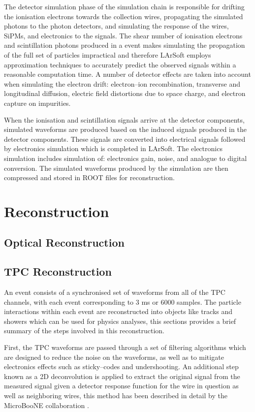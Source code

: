 The detector simulation phase of the simulation chain is responsible for
drifting the ionisation electrons towards the collection wires, propagating the
simulated photons to the photon detectors, and simulating the response of the
wires, SiPMs, and electronics to the signals. The shear number of ionisation 
electrons and scintillation photons produced in a \protodune{} event makes 
simulating the propagation of the full set of particles impractical and 
therefore LArSoft employs approximation techniques to accurately predict the 
observed signals within a reasonable computation time. A number of detector 
effects are taken into account when simulating the electron drift: 
electron--ion recombination, transverse and longitudinal diffusion, electric 
field distortions due to space charge, and electron capture on impurities. 

When the ionisation and scintillation signals arrive at the detector components,
simulated waveforms are produced based on the induced signals produced in the
detector components. These signals are converted into electrical signals
followed by electronics simulation which is completed in LArSoft. The
electronics simulation includes simulation of: electronics gain, noise, and 
analogue to digital conversion. The simulated waveforms produced by the 
\protodune{} simulation are then compressed and stored in ROOT files for 
reconstruction.

\section{Reconstruction} \label{sec:reconstruction}
\subsection{Optical Reconstruction} \label{sec:op_reco}


\subsection{TPC Reconstruction} \label{sec:tpc_reco}
An event consists of a synchronised set of waveforms from all of the TPC 
channels, with each event corresponding to 3 ms or 6000 samples. The particle
interactions within each event are reconstructed into objects like tracks and
showers which can be used for physics analyses, this sections provides a brief 
summary of the steps involved in this reconstruction.

First, the TPC waveforms are passed through a set of filtering algorithms which
are designed to reduce the noise on the waveforms, as well as to mitigate 
electronics effects such as sticky--codes and undershooting. An additional step
known as a 2D deconvolution is applied to extract the original signal from the
measured signal given a detector response function for the wire in question as
well as neighboring wires, this method has been described in detail by the 
MicroBooNE collaboration \cite{Adams:2018dra}.

